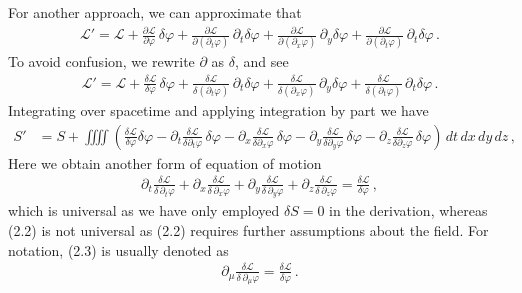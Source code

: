 \documentclass[11pt, onesided]{book}
\theoremstyle{break}
\theoremstyle{break}
\newcommand{\pd}{\partial}
\begin{document}
For another approach, we can approximate that
\begin{align*}
\mathcal{L}' = \mathcal{L} + \frac{\pd \mathcal{L}}{\pd \varphi}\, \delta \varphi + \frac{\pd \mathcal{L}}{\pd (\pd_t \varphi)} \, \pd_t \delta \varphi + \frac{\pd \mathcal{L}}{\pd (\pd_x\varphi)} \, \pd_y \delta \varphi + \frac{\pd \mathcal{L}}{\pd (\pd_t\varphi)} \, \pd_t\delta \varphi\,.
\end{align*}
To avoid confusion, we rewrite $\pd$ as $\delta$, and see 
\begin{align*}
\mathcal{L}' = \mathcal{L} + \frac{\delta \mathcal{L}}{\delta \varphi}\, \delta \varphi + \frac{\delta \mathcal{L}}{\delta (\pd_t \varphi)} \, \pd_t \delta \varphi + \frac{\delta \mathcal{L}}{\delta (\pd_x\varphi)} \, \pd_y \delta \varphi + \frac{\delta \mathcal{L}}{\delta (\pd_t\varphi)} \, \pd_t\delta \varphi\,.
\end{align*}
Integrating over spacetime and applying integration by part we have
\begin{align*}
S' 
&= S+ \iiiint  \left(\frac{\delta \mathcal{L}}{\delta \varphi}\delta \varphi - \pd_t \frac{\delta \mathcal{L}}{\delta \pd_t \varphi}\, \delta \varphi  - \pd_x \frac{\delta \mathcal{L}}{\delta \pd_x \varphi} \, \delta \varphi  -  \pd_y \frac{\delta \mathcal{L}}{\delta \pd_y \varphi} \, \delta \varphi  -  \pd_z \frac{\delta \mathcal{L}}{\delta \pd_z \varphi} \, \delta\varphi\right)         \,dt\,dx\,dy\,dz \,,
\end{align*}
Here we obtain another form of equation of motion
\begin{align}
\pd_t \frac{\delta \mathcal{L}}{\delta\, \pd_t \varphi} + \pd_x \frac{\delta \mathcal{L}}{\delta\, \pd_x \varphi} + \pd_y \frac{\delta \mathcal{L}}{\delta \,\pd_y \varphi} + \pd_z \frac{\delta \mathcal{L}}{\delta\, \pd_z \varphi} = \frac{\delta \mathcal{L}}{\delta \varphi}\,,
\end{align}
which is universal as we have only employed $\delta S = 0$ in the derivation, whereas (2.2) is not universal as (2.2) requires further assumptions about the field. For notation, (2.3) is usually denoted as
\begin{align}
\pd_\mu \frac{\delta \mathcal{L}}{\delta \, \pd_\mu \varphi} = \frac{\delta \mathcal{L}}{\delta \varphi}\,.
\end{align}
\end{document}
